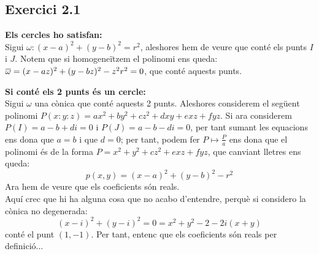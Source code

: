 \documentclass[11pt, a4paper]{article}
\begin{document}
\subsection{Exercici 2.1}
\textbf{Els cercles ho satisfan:}\\
Sigui $\omega: (x-a)^2+(y-b)^2=r^2$, aleshores hem de veure que conté els punts $I$ i $J$. Notem que si homogeneïtzem el polinomi ens queda: $\overline\omega=(x-az)^2+(y-bz)^2-z^2r^2=0$, que conté aquests punts.\par\vspace{7mm}
\textbf{Si conté els 2 punts és un cercle:}\\
Sigui $\omega$ una cònica que conté aquests 2 punts. Aleshores considerem el següent polinomi $P(x:y:z)=ax^2+by^2+cz^2+dxy+exz+fyz$. Si ara considerem $P(I)=a-b+di=0$ i $P(J)=a-b-di=0$, per tant sumant les equacions ens dona que $a=b$ i que $d=0$; per tant, podem fer $P\mapsto \frac{P}{a}$ ens dona que el polinomi és de la forma $P=x^2+y^2+cz^2+exz+fyz$, que canviant lletres ens queda:
\[
p(x,y)=(x-a)^2+(y-b)^2-r^2
\]
Ara hem de veure que els coeficients són reals.\\
Aquí crec que hi ha alguna cosa que no acabo d'entendre, perquè si considero la cònica no degenerada:
\[
    (x-i)^2+(y-i)^2=0=x^2+y^2-2-2i(x+y)
\]
conté el punt $(1,-1)$. Per tant, entenc que els coeficients són reals per definició...
\end{document}
